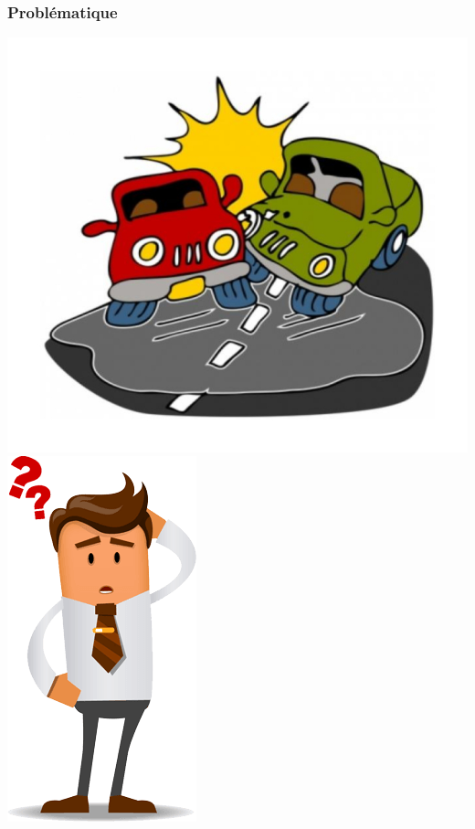 \documentclass{beamer}
\begin{document}
\begin{frame}
    \frametitle{Problématique}
    \includegraphics[width=.6\textwidth]{figures/datamanagement-issues.jpg}
    \includegraphics[width=.32\textwidth]{figures/question.png}
\end{frame}
\end{document}
